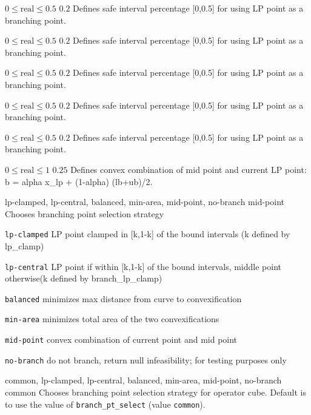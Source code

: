 %
{$0\leq\textrm{real}\leq0.5$}%
{$0.2$}%
{Defines safe interval percentage [0,0.5] for using LP point as a branching point.}%
{}

%
{$0\leq\textrm{real}\leq0.5$}%
{$0.2$}%
{Defines safe interval percentage [0,0.5] for using LP point as a branching point.}%
{}

%
{$0\leq\textrm{real}\leq0.5$}%
{$0.2$}%
{Defines safe interval percentage [0,0.5] for using LP point as a branching point.}%
{}

%
{$0\leq\textrm{real}\leq0.5$}%
{$0.2$}%
{Defines safe interval percentage [0,0.5] for using LP point as a branching point.}%
{}

%
{$0\leq\textrm{real}\leq0.5$}%
{$0.2$}%
{Defines safe interval percentage [0,0.5] for using LP point as a branching point.}%
{}

%
{$0\leq\textrm{real}\leq1$}%
{$0.25$}%
{Defines convex combination of mid point and current LP point: b = alpha x\_lp + (1-alpha) (lb+ub)/2.}%
{}

%
{\ttfamily lp-clamped, lp-central, balanced, min-area, mid-point, no-branch}%
{mid-point}%
{Chooses branching point selection strategy}%
{\begin{list}{}{
\setlength{\parsep}{0em}
\setlength{\leftmargin}{5ex}
\setlength{\labelwidth}{2ex}
\setlength{\itemindent}{0ex}
\setlength{\topsep}{0pt}}
\item[\texttt{lp-clamped}] LP point clamped in [k,1-k] of the bound intervals (k defined by lp\_clamp)
\item[\texttt{lp-central}] LP point if within [k,1-k] of the bound intervals, middle point otherwise(k defined by branch\_lp\_clamp)
\item[\texttt{balanced}] minimizes max distance from curve to convexification
\item[\texttt{min-area}] minimizes total area of the two convexifications
\item[\texttt{mid-point}] convex combination of current point and mid point
\item[\texttt{no-branch}] do not branch, return null infeasibility; for testing purposes only
\end{list}
}

%
{\ttfamily common, lp-clamped, lp-central, balanced, min-area, mid-point, no-branch}%
{common}%
{Chooses branching point selection strategy for operator cube.
Default is to use the value of \texttt{branch\_pt\_select} (value \texttt{common}).}%
{}

